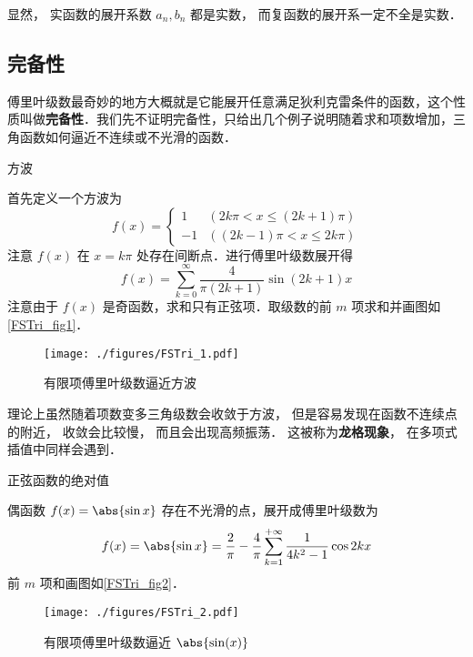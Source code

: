 显然， 实函数的展开系数 $a_n, b_n$ 都是实数， 而复函数的展开系一定不全是实数．

\subsection{完备性}
傅里叶级数最奇妙的地方大概就是它能展开任意满足狄利克雷条件的函数，这个性质叫做\textbf{完备性}．我们先不证明完备性，只给出几个例子说明随着求和项数增加，三角函数如何逼近不连续或不光滑的函数．

\begin{example}{方波}\label{FSTri_ex1}

首先定义一个方波为
\begin{equation}\label{FSTri_eq7}
f(x) = 
\begin{cases}
1  & (2k\pi < x \leqslant (2k + 1)\pi) \\
- 1 &  ((2k - 1)\pi < x \leqslant 2k\pi)
\end{cases}
\end{equation}
注意 $f(x)$ 在 $x=k\pi$ 处存在间断点．进行傅里叶级数展开得
\begin{equation}\label{FSTri_eq5}
f(x) = \sum_{k = 0}^\infty \frac{4}{\pi (2k + 1)}\sin (2k + 1)x
\end{equation}
注意由于 $f(x)$ 是奇函数，求和只有正弦项．取级数的前 $m$ 项求和并画图如\autoref{FSTri_fig1}．

\begin{figure}[ht]
\centering
\texttt{[image: ./figures/FSTri\_1.pdf]}
\caption{有限项傅里叶级数逼近方波}\label{FSTri_fig1}
\end{figure}
理论上虽然随着项数变多三角级数会收敛于方波， 但是容易发现在函数不连续点的附近， 收敛会比较慢， 而且会出现高频振荡． 这被称为\textbf{龙格现象}， 在多项式插值中同样会遇到．
\end{example}

\begin{example}{正弦函数的绝对值}

偶函数 $f(x) = \abs{\sin x}$ 存在不光滑的点，展开成傅里叶级数为
\begin{equation}\label{FSTri_eq6}
f(x) = \abs{\sin x} = \frac{2}{\pi } - \frac{4}{\pi }\sum_{k = 1}^{+\infty} \frac{1}{4 k^2 - 1}\cos 2k x
\end{equation}
前 $m$ 项和画图如\autoref{FSTri_fig2}．
\begin{figure}[ht]
\centering
\texttt{[image: ./figures/FSTri\_2.pdf]}
\caption{有限项傅里叶级数逼近 $\abs{\sin(x)}$}\label{FSTri_fig2}
\end{figure}
\end{example}

